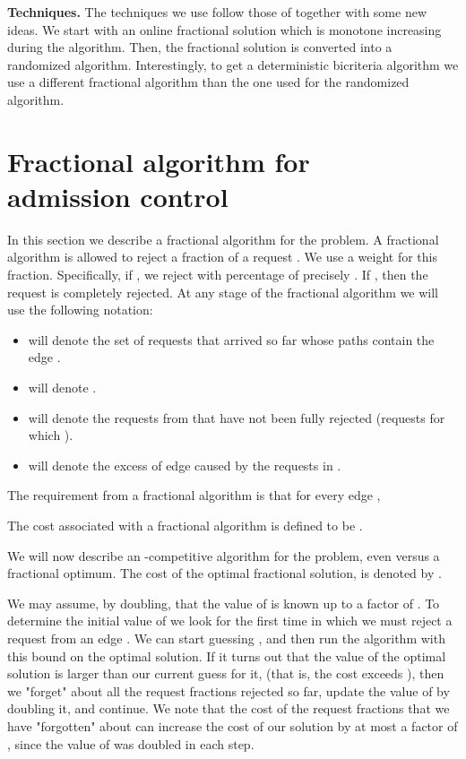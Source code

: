 \documentclass{sig-alternate}
\begin{document}
\textbf{Techniques.} The techniques we use follow those of
\cite{AAABN03,AAABN04} together with some new ideas. We start with
an online fractional solution which is monotone increasing during
the algorithm. Then, the fractional solution is converted into a
randomized algorithm. Interestingly, to get a deterministic
bicriteria algorithm we use a different fractional algorithm than
the one used for the randomized algorithm.



\section{Fractional algorithm for \\ admission control}\label{sec:frac}
In this section we describe a fractional algorithm for the
problem. A fractional algorithm is allowed to reject a fraction of
a request . We use a weight  for this fraction.
Specifically, if , we reject with percentage of
precisely . If , then the request is completely
rejected. At any stage of the fractional algorithm we will use the
following notation:
\begin{itemize}
    \item  will denote the set of requests that arrived
    so far whose paths contain the edge .
    \item  will denote .
    \item  will denote the requests from 
    that have not been fully rejected (requests  for which ).
    \item  will denote the excess of edge  caused by the
    requests in .
    
\end{itemize}
The requirement from a fractional algorithm is that for every edge
,

The cost associated with a fractional algorithm is defined to be
.

We will now describe an -competitive algorithm for
the problem, even versus a fractional optimum. The cost of the
optimal fractional solution,  is denoted by .

We may assume, by doubling, that the value of  is known up
to a factor of . To determine the initial value of  we
look for the first time in which we must reject a request from an
edge . We can start guessing ,
and then run the algorithm with this bound on the optimal
solution. If it turns out that the value of the optimal solution
is larger than our current guess for it, (that is, the cost
exceeds ), then we "forget" about all
the request fractions rejected so far, update the value of
 by doubling it, and continue. We note that the cost of
the request fractions that we have "forgotten" about can increase
the cost of our solution by at most a factor of , since the
value of  was doubled in each step.
\end{document}
